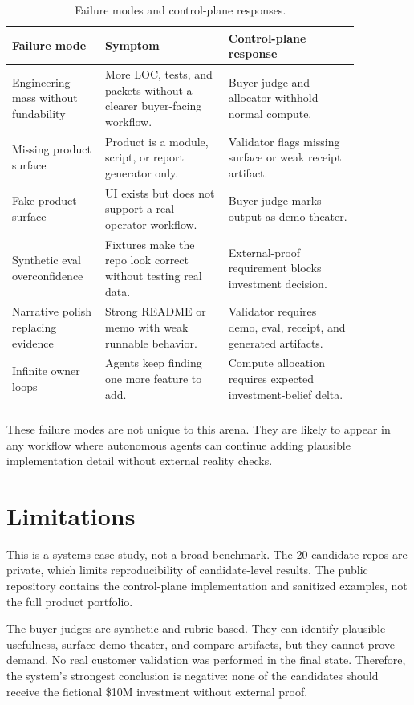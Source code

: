 \documentclass[11pt]{article}
\begin{document}
\begin{longtable}{L{0.22\linewidth} L{0.31\linewidth} L{0.33\linewidth}}
\toprule
Failure mode & Symptom & Control-plane response \\
\midrule
\endhead
Engineering mass without fundability & More LOC, tests, and packets without a clearer buyer-facing workflow. & Buyer judge and allocator withhold normal compute. \\
Missing product surface & Product is a module, script, or report generator only. & Validator flags missing surface or weak receipt artifact. \\
Fake product surface & UI exists but does not support a real operator workflow. & Buyer judge marks output as demo theater. \\
Synthetic eval overconfidence & Fixtures make the repo look correct without testing real data. & External-proof requirement blocks investment decision. \\
Narrative polish replacing evidence & Strong README or memo with weak runnable behavior. & Validator requires demo, eval, receipt, and generated artifacts. \\
Infinite owner loops & Agents keep finding one more feature to add. & Compute allocation requires expected investment-belief delta. \\
\bottomrule
\caption{Failure modes and control-plane responses.}
\end{longtable}

These failure modes are not unique to this arena. They are likely to appear in any workflow where autonomous agents can continue adding plausible implementation detail without external reality checks.

\section{Limitations}

This is a systems case study, not a broad benchmark. The 20 candidate repos are private, which limits reproducibility of candidate-level results. The public repository contains the control-plane implementation and sanitized examples, not the full product portfolio.

The buyer judges are synthetic and rubric-based. They can identify plausible usefulness, surface demo theater, and compare artifacts, but they cannot prove demand. No real customer validation was performed in the final state. Therefore, the system's strongest conclusion is negative: none of the candidates should receive the fictional \$10M investment without external proof.
\end{document}
